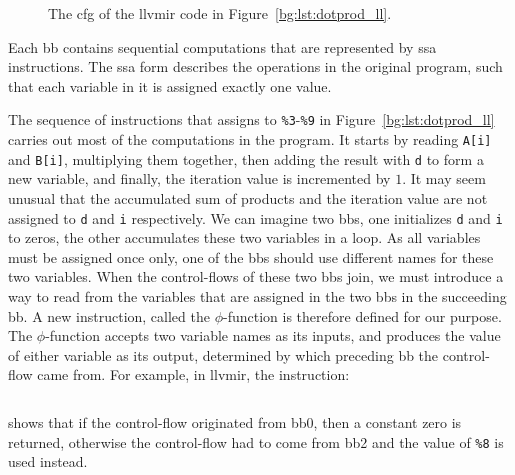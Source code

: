 \begin{figure}[ht]
    \centering
    \caption{%
        The \gls{cfg} of the \gls{llvmir} code in
        Figure~\ref{bg:lst:dotprod_ll}.
    }\label{bg:fig:dotprod_cfg}
\end{figure}

Each \gls{bb} contains sequential computations that are represented by
\gls{ssa} instructions.  The \gls{ssa} form describes the operations in the
original program, such that each variable in it is assigned exactly one value.

The sequence of instructions that assigns to \verb|%3|-\verb|%9| in
Figure~\ref{bg:lst:dotprod_ll} carries out most of the computations in the
program.  It starts by reading \verb|A[i]| and \verb|B[i]|, multiplying them
together, then adding the result with \verb|d| to form a new variable, and
finally, the iteration value is incremented by $1$.  It may seem unusual that
the accumulated sum of products and the iteration value are not assigned
to \verb|d| and \verb|i| respectively.  We can imagine two \glspl{bb}, one
initializes \verb|d| and \verb|i| to zeros, the other accumulates these two
variables in a loop.  As all variables must be assigned once only, one of
the \glspl{bb} should use different names for these two variables.  When the
control-flows of these two \glspl{bb} join, we must introduce a way to read
from the variables that are assigned in the two \glspl{bb} in the succeeding
\gls{bb}\@.  A new instruction, called the $\phi$-function is therefore defined
for our purpose.  The $\phi$-function accepts two variable names as its inputs,
and produces the value of either variable as its output, determined by which
preceding \gls{bb} the control-flow came from.  For example, in \gls{llvmir},
the instruction:
\begin{lstlisting}[language=LLVM]
    %d.01 = phi float [ 0.000000e+00, %0 ], [ %8, %2 ]
\end{lstlisting}\vspace{-10pt}
shows that if the control-flow originated from \gls{bb}0, then a constant zero
is returned, otherwise the control-flow had to come from \gls{bb}2 and the
value of \verb|%8| is used instead.

